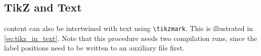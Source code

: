 \begin{figure}
{
    }
\end{figure}

\subsection{TikZ and Text}

 content can also be intertwined with text using \verb|\tikzmark|.
This is illustrated in \cref{eq:tikz_in_text}.
Note that this procedure needs two compilation runs, since the label positions
need to be written to an auxiliary file first.

